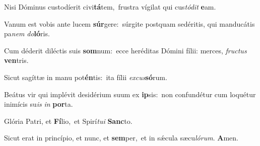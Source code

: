 
Nisi Dóminus custodíerit civi\textbf{tá}tem,~\redgreheightstar frustra vígilat qui cus\textit{tó}\textit{dit} \textbf{e}am.

Vanum est vobis ante lucem \textbf{súr}gere:~\redgreheightstar súrgite postquam sedéritis, qui manducátis pa\textit{nem} \textit{do}\textbf{ló}ris.

Cum déderit diléctis suis \textbf{som}num:~\redgreheightstar ecce heréditas Dómini fílii: merces, \textit{fruc}\textit{tus} \textbf{ven}tris.

Sicut sagíttæ in manu pot\textbf{én}tis:~\redgreheightstar ita fílii \textit{ex}\textit{cus}\textbf{só}rum.

Beátus vir qui implévit desidérium suum ex \textbf{ip}sis:~\redgreheightstar non confundétur cum loquétur inimícis su\textit{is} \textit{in} \textbf{por}ta.

Glória Patri, et \textbf{Fí}lio,~\redgreheightstar et Spirí\textit{tu}\textit{i} \textbf{Sanc}to.

Sicut erat in princípio, et nunc, et \textbf{sem}per,~\redgreheightstar et in sǽcula sæcu\textit{ló}\textit{rum}. \textbf{A}men.

